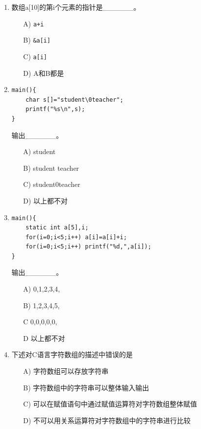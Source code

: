 \documentclass[a4paper,12pt]{article}
\begin{document}
\begin{enumerate}
	\item 数组a[10]的第i个元素的指针是\_\_\_\_\_\_。
	      \begin{enumerate}
		      \item[A)] \texttt{a+i}
		      \item[B)] \texttt{\&a[i]}
		      \item[C)] \texttt{a[i]}
		      \item[D)] A和B都是
	      \end{enumerate}
	      \vspace{0.3cm}

	\item
	      \begin{verbatim}
main(){
    char s[]="student\0teacher";
    printf("%s\n",s);
}
    \end{verbatim}
	      输出\_\_\_\_\_\_。
	      \begin{enumerate}
		      \item[A)] student
		      \item[B)] student teacher
		      \item[C)] student0teacher
		      \item[D)] 以上都不对
	      \end{enumerate}
	      \vspace{0.3cm}

	\item
	      \begin{verbatim}
main(){
    static int a[5],i;
    for(i=0;i<5;i++) a[i]=a[i]+i;
    for(i=0;i<5;i++) printf("%d,",a[i]);
}
    \end{verbatim}
	      输出\_\_\_\_\_\_。
	      \begin{enumerate}
		      \item[A)] 0,1,2,3,4,
		      \item[B)] 1,2,3,4,5,
		      \item[C] 0,0,0,0,0,
		      \item[D] 以上都不对
	      \end{enumerate}
	      \vspace{0.3cm}

	\item 下述对C语言字符数组的描述中错误的是
	      \begin{enumerate}
		      \item[A)] 字符数组可以存放字符串
		      \item[B)] 字符数组中的字符串可以整体输入输出
		      \item[C)] 可以在赋值语句中通过赋值运算符对字符数组整体赋值
		      \item[D)] 不可以用关系运算符对字符数组中的字符串进行比较
	      \end{enumerate}
	      \vspace{0.3cm}


\end{enumerate}
\end{document}
